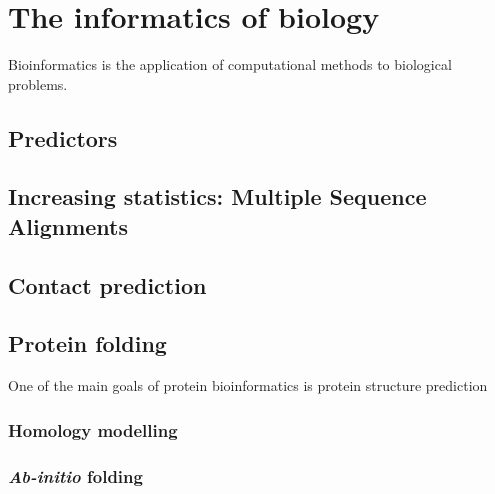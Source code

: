 \chapter{The informatics of biology}
Bioinformatics is the application of computational methods to biological problems.


\section{Predictors}

\section[Multiple Sequence Alignments]{Increasing statistics: Multiple Sequence Alignments}

\section{Contact prediction}

\section{Protein folding}
One of the main goals of protein bioinformatics is protein structure prediction 

\subsection{Homology modelling}
\subsection{\emph{Ab-initio} folding}
